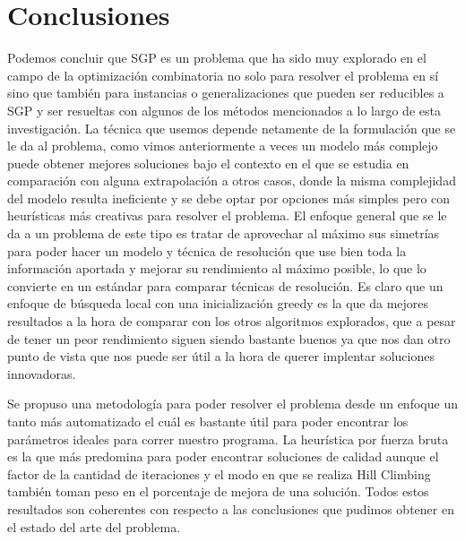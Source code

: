 \documentclass[letter, 10pt]{article}
\begin{document}
\section{Conclusiones} \label{conc}

Podemos concluir que SGP es un problema que ha sido muy explorado en el campo de la optimización combinatoria no solo para resolver el problema en sí sino que también para instancias o generalizaciones que pueden ser reducibles a SGP y ser resueltas con algunos de los métodos mencionados a lo largo de esta investigación. La técnica que usemos depende netamente de la formulación que se le da al problema, como vimos anteriormente a veces un modelo más complejo puede obtener mejores soluciones bajo el contexto en el que se estudia en comparación con alguna extrapolación a otros casos, donde la misma complejidad del modelo resulta ineficiente y se debe optar por opciones más simples pero con heurísticas más creativas para resolver el problema. El enfoque general que se le da a un problema de este tipo es tratar de aprovechar al máximo sus simetrías para poder hacer un modelo y técnica de resolución que use bien toda la información aportada y mejorar su rendimiento al máximo posible, lo que lo convierte en un estándar para comparar técnicas de resolución. Es claro que un enfoque de búsqueda local con una inicialización greedy es la que da mejores resultados a la hora de comparar con los otros algoritmos explorados, que a pesar de tener un peor rendimiento siguen siendo bastante buenos ya que nos dan otro punto de vista que nos puede ser útil a la hora de querer implentar soluciones innovadoras. 

Se propuso una metodología para poder resolver el problema desde un enfoque un tanto más automatizado el cuál es bastante útil para poder encontrar los parámetros ideales para correr nuestro programa. La heurística por fuerza bruta es la que más predomina para poder encontrar soluciones de calidad aunque el factor de la cantidad de iteraciones y el modo en que se realiza Hill Climbing también toman peso en el porcentaje de mejora de una solución. Todos estos resultados son coherentes con respecto a las conclusiones que pudimos obtener en el estado del arte del problema.

\printbibliography
\end{document}
